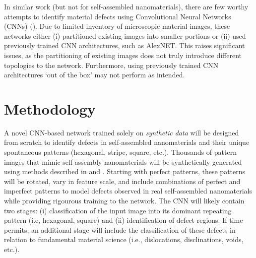 \documentclass[twoside,11pt]{article}
\begin{document}
In similar work (but not for self-assembled nanomaterials), there are few worthy attempts to identify material defects using Convolutional Neural Networks (CNNs) (\cite{Chowdhury2016, Dong2020, Boyadjian2020}). Due to limited inventory of microscopic material images, these networks either (i) partitioned existing images into smaller portions or (ii) used previously trained CNN architectures, such as AlexNET. This raises significant issues, as the partitioning of existing images does not truly introduce different topologies to the network. Furthermore, using previously trained CNN architectures `out of the box' may not perform as intended. 


\section{Methodology}

A novel CNN-based network trained solely on \textit{synthetic data} will be designed from scratch to identify defects in self-assembled nanomaterials and their unique spontaneous patterns (hexagonal, stripe, square, etc.). Thousands of pattern images that mimic self-assembly nanomaterials will be synthetically generated using methods described in \cite{Stein1989} and \cite{Gunaratne1994}. Starting with perfect patterns, these patterns will be rotated, vary in feature scale, and include combinations of perfect and imperfect patterns to model defects observed in real self-assembled nanomaterials while providing rigourous training to the network. The CNN will likely contain two stages: (i) classification of the input image into its dominant repeating pattern (i.e, hexagonal, square) and (ii) identification of defect regions. If time permits, an additional stage will include the classification of these defects in relation to fundamental material science (i.e., dislocations, disclinations, voids, etc.). 







\vskip 0.2in

\end{document}
